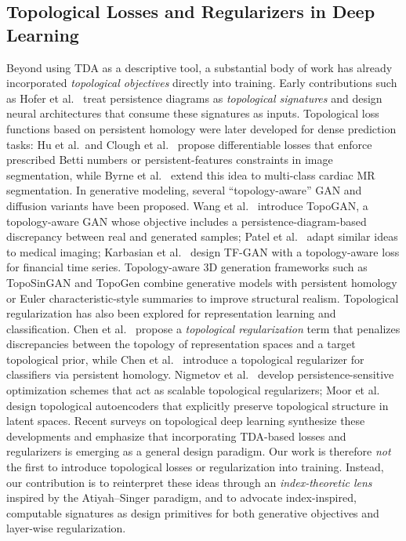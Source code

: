 \documentclass[10pt,leqno]{amsart}
\begin{document}
\subsection{Topological Losses and Regularizers in Deep Learning}
Beyond using TDA as a descriptive tool, a substantial body of work has already incorporated \emph{topological objectives} directly into training. Early contributions such as Hofer et al.\ \cite{hofer2017deep} treat persistence diagrams as \emph{topological signatures} and design neural architectures that consume these signatures as inputs. Topological loss functions based on persistent homology were later developed for dense prediction tasks: Hu et al.\ and Clough et al.\ \cite{clough2020topological} propose differentiable losses that enforce prescribed Betti numbers or persistent-features constraints in image segmentation, while Byrne et al.\ \cite{byrne2021phloss} extend this idea to multi-class cardiac MR segmentation.
In generative modeling, several ``topology-aware'' GAN and diffusion variants have been proposed. Wang et al.\ \cite{wang2020topogan} introduce TopoGAN, a topology-aware GAN whose objective includes a persistence-diagram-based discrepancy between real and generated samples; Patel et al.\ \cite{patel2023topoganmedical} adapt similar ideas to medical imaging; Karbasian et al.\ \cite{karbasian2025tfgan} design TF-GAN with a topology-aware loss for financial time series. Topology-aware 3D generation frameworks such as TopoSinGAN and TopoGen \cite{ahmadkhani2024toposingan,topogen2025} combine generative models with persistent homology or Euler characteristic-style summaries to improve structural realism.
Topological regularization has also been explored for representation learning and classification. Chen et al.\ \cite{chen2023toporeg} propose a \emph{topological regularization} term that penalizes discrepancies between the topology of representation spaces and a target topological prior, while Chen et al.\ \cite{chen2019topoclassifier} introduce a topological regularizer for classifiers via persistent homology. Nigmetov et al.\ \cite{nigmetov2024persistent} develop persistence-sensitive optimization schemes that act as scalable topological regularizers; Moor et al.\ \cite{moor2020topoae} design topological autoencoders that explicitly preserve topological structure in latent spaces. Recent surveys on topological deep learning \cite{zia2024topodl,papamarkou2024position} synthesize these developments and emphasize that incorporating TDA-based losses and regularizers is emerging as a general design paradigm.
Our work is therefore \emph{not} the first to introduce topological losses or regularization into training. Instead, our contribution is to reinterpret these ideas through an \emph{index-theoretic lens} inspired by the Atiyah--Singer paradigm, and to advocate index-inspired, computable signatures as design primitives for both generative objectives and layer-wise regularization.
\end{document}
